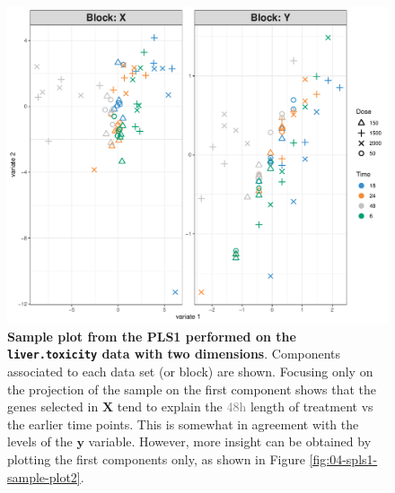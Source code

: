 \documentclass[
]{book}
\newenvironment{Shaded}{\begin{snugshade}}{\end{snugshade}}
\newcommand{\AttributeTok}[1]{\textcolor[rgb]{0.77,0.63,0.00}{#1}}
\newcommand{\ConstantTok}[1]{\textcolor[rgb]{0.00,0.00,0.00}{#1}}
\newcommand{\DecValTok}[1]{\textcolor[rgb]{0.00,0.00,0.81}{#1}}
\newcommand{\FunctionTok}[1]{\textcolor[rgb]{0.00,0.00,0.00}{#1}}
\newcommand{\NormalTok}[1]{#1}
\newcommand{\OtherTok}[1]{\textcolor[rgb]{0.56,0.35,0.01}{#1}}
\newcommand{\SpecialCharTok}[1]{\textcolor[rgb]{0.00,0.00,0.00}{#1}}
\newcommand{\StringTok}[1]{\textcolor[rgb]{0.31,0.60,0.02}{#1}}
\begin{document}
\begin{Shaded}
\end{Shaded}

\begin{figure}

{\centering \includegraphics[width=0.7\linewidth]{Figures/PLS/04-spls1-sample-plot-1} 

}

\caption{\textbf{Sample plot from the PLS1 performed on the \texttt{liver.toxicity} data with two dimensions}. Components associated to each data set (or block) are shown. Focusing only on the projection of the sample on the first component shows that the genes selected in \(\boldsymbol X\) tend to explain the \textcolor{grey}{48h} length of treatment vs the earlier time points. This is somewhat in agreement with the levels of the \(\boldsymbol y\) variable. However, more insight can be obtained by plotting the first components only, as shown in Figure \ref{fig:04-spls1-sample-plot2}.}\label{fig:04-spls1-sample-plot}
\end{figure}
\end{document}
